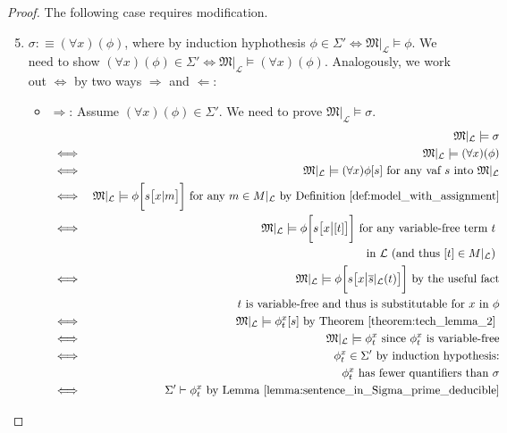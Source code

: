 \documentclass[11pt,letterpaper]{book}
\theoremstyle{definition}
\begin{document}
\begin{enumerate}
{\begin{proof}
The following case requires modification.
\begin{enumerate}
\setcounter{enumii}{4}
\item{$\sigma :\equiv (\forall x) (\phi) $, where by induction
hyphothesis $\phi \in \Sigma' \iff \mathfrak{M}|_{\mathcal{L}} \models
\phi $. We need to show $(\forall x) (\phi) \in \Sigma' \iff
\mathfrak{M}|_{\mathcal{L}} \models (\forall x) (\phi)$. Analogously, we
work out $\iff$ by two ways $\Longrightarrow$ and $\Longleftarrow$:
\begin{itemize}
\item[]{$\Longrightarrow$: Assume $(\forall x) (\phi) \in \Sigma'$. We
need to prove $\mathfrak{M}|_{\mathcal{L}} \models \sigma$.
\begin{eqnarray*}
& & \mathfrak{M}|_{\mathcal{L}} \models \sigma \\
& \iff & \mathfrak{M}|_{\mathcal{L}} \models (\forall x) (\phi) \\
& \iff & \mathfrak{M}|_{\mathcal{L}} \models (\forall x) \phi[s] \text{
for any vaf $s$ into $\mathfrak{M}|_{\mathcal{L}}$} \\
& \iff & \mathfrak{M}|_{\mathcal{L}} \models \phi\bigg[ s\big[ x| m
\big] \bigg] \text{ for any } m \in M|_{\mathcal{L}} \text{ by
Definition \ref{def:model_with_assignment}} \\
& \iff & \mathfrak{M}|_{\mathcal{L}} \models \phi\bigg[ s\big[ x\big|
[t] \big] \bigg] \text{ for any variable-free term $t$ } \\
& & \quad \text{in $\mathcal{L}$
(and thus $[t] \in M|_{\mathcal{L}}$) } \\
& \iff &  \mathfrak{M}|_{\mathcal{L}} \models \phi\bigg[ s\big[ x\big|
\overline{s}|_{\mathcal{L}} (t) \big] \bigg] \text{ by the useful fact}  \\
& & \quad \text{$t$ is variable-free and thus is substitutable for $x$ in
$\phi$} \\
& \iff &  \mathfrak{M}|_{\mathcal{L}} \models \phi_t ^x [s] \text{ by
Theorem \ref{theorem:tech_lemma_2} } \\
& \iff & \mathfrak{M}|_{\mathcal{L}} \models \phi_t ^x \text{ since
$\phi_t ^x$ is variable-free} \\
& \iff & \phi_t ^x \in \Sigma' \text{ by induction hypothesis:} \\
& & \quad \text{ $\phi_t
^x$ has fewer quantifiers than $\sigma$} \\
& \iff & \Sigma' \vdash \phi_t ^x \text{ by Lemma
\ref{lemma:sentence_in_Sigma_prime_deducible}}
\end{eqnarray*}

}
\end{itemize}}
\end{enumerate}
\end{proof}}
\end{enumerate}
\end{document}
